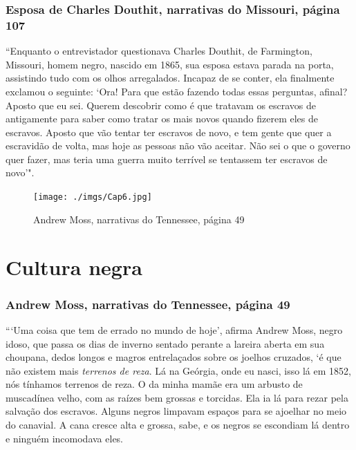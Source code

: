 \subsection{Esposa de Charles Douthit, narrativas do Missouri, página 107} \label{ref75}

``Enquanto o entrevistador questionava Charles Douthit, de
Farmington, Missouri, homem negro, nascido em 1865, sua esposa estava
parada na porta, assistindo tudo com os olhos arregalados. Incapaz de se
conter, ela finalmente exclamou o seguinte: `Ora! Para que estão fazendo
todas essas perguntas, afinal? Aposto que eu sei. Querem descobrir como
é que tratavam os escravos de antigamente para saber como tratar os mais
novos quando fizerem eles de escravos. Aposto que vão tentar ter
escravos de novo, e tem gente que quer a escravidão de volta, mas hoje
as pessoas não vão aceitar. Não sei o que o governo quer fazer, mas
teria uma guerra muito terrível se tentassem ter escravos de novo'".

\pagebreak
\thispagestyle{empty}

\begin{absolutelynopagebreak}
\begin{vplace}
\begin{figure}[H]
\begin{adjustwidth}{-1.6cm}{}
  \vspace*{-2cm}
  \texttt{[image: ./imgs/Cap6.jpg]}  
\end{adjustwidth}
  \caption{Andrew Moss, narrativas do Tennessee, página 49}
\end{figure}
\end{vplace}

\end{absolutelynopagebreak}

\chapter{Cultura negra}

\subsection{Andrew Moss, narrativas do Tennessee, página 49}
\label{ref202}

```Uma coisa que tem de errado no mundo de hoje', afirma Andrew Moss,
negro idoso, que passa os dias de inverno sentado perante a lareira
aberta em sua choupana, dedos longos e magros entrelaçados sobre os
joelhos cruzados, `é que não existem mais \emph{terrenos de reza}. Lá na
Geórgia, onde eu nasci, isso lá em 1852, nós tínhamos terrenos de reza.
O da minha mamãe era um arbusto de muscadínea velho, com as raízes bem
grossas e torcidas. Ela ia lá para rezar pela salvação dos escravos.
Alguns negros limpavam espaços para se ajoelhar no meio do canavial. A
cana cresce alta e grossa, sabe, e os negros se escondiam lá dentro e
ninguém incomodava eles.

